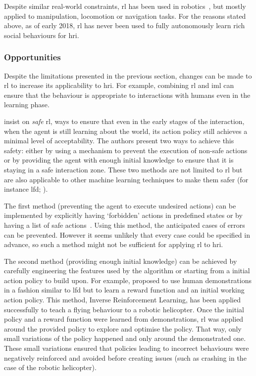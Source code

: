 	Despite similar real-world constraints, \gls{rl} has been used in robotics~\citep{kober2013reinforcement}, but mostly applied to manipulation, locomotion or navigation tasks. For the reasons stated above, as of early 2018, \gls{rl} has never been used to fully autonomously learn rich social behaviours for \gls{hri}. 
	
	\subsubsection{Opportunities}  
	Despite the limitations presented in the previous section, changes can be made to \gls{rl} to increase its applicability to \gls{hri}. For example, combining \gls{rl} and \gls{iml} can ensure that the behaviour is appropriate to interactions with humans even in the learning phase.
	
	\cite{garcia2015comprehensive} insist on \textit{safe} \gls{rl}, ways to ensure that even in the early stages of the interaction, when the agent is still learning about the world, its action policy still achieves a minimal level of acceptability. The authors present two ways to achieve this safety: either by using a mechanism to prevent the execution of non-safe actions or by providing the agent with enough initial knowledge to ensure that it is staying in a safe interaction zone. These two methods are not limited to \gls{rl} but are also applicable to other machine learning techniques to make them safer (for instance \gls{lfd}; \citealt{billard2008robot}). 
	
	The first method (preventing the agent to execute undesired actions) can be implemented by explicitly having `forbidden' actions in predefined states or by having a list of safe actions~\citep{alshiekh2017safe}. Using this method, the anticipated cases of errors can be prevented. However it seems unlikely that every case could be specified in advance, so such a method might not be sufficient for applying \gls{rl} to \gls{hri}. %
	
	The second method (providing enough initial knowledge) can be achieved by carefully engineering the features used by the algorithm or starting from a initial action policy to build upon. For example, \cite{abbeel2004apprenticeship} proposed to use human demonstrations in a fashion similar to \gls{lfd} but to learn a reward function and an initial working action policy. This method, Inverse Reinforcement Learning, has been applied successfully to teach a flying behaviour to a robotic helicopter. Once the initial policy and a reward function were learned from demonstrations, \gls{rl} was applied around the provided policy to explore and optimise the policy. That way, only small variations of the policy happened and only around the demonstrated one. These small variations ensured that policies leading to incorrect behaviours were negatively reinforced and avoided before creating issues (such as crashing in the case of the robotic helicopter). 
	

